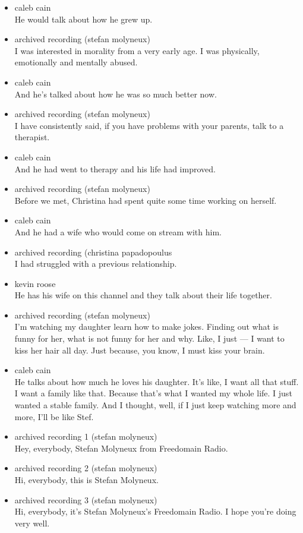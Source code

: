 \begin{itemize}
\item
  caleb cain\\
  He would talk about how he grew up.
\item
  archived recording (stefan molyneux)\\
  I was interested in morality from a very early age. I was physically,
  emotionally and mentally abused.
\item
  caleb cain\\
  And he's talked about how he was so much better now.
\item
  archived recording (stefan molyneux)\\
  I have consistently said, if you have problems with your parents, talk
  to a therapist.
\item
  caleb cain\\
  And he had went to therapy and his life had improved.
\item
  archived recording (stefan molyneux)\\
  Before we met, Christina had spent quite some time working on herself.
\item
  caleb cain\\
  And he had a wife who would come on stream with him.
\item
  archived recording (christina papadopoulus\\
  I had struggled with a previous relationship.
\item
  kevin roose\\
  He has his wife on this channel and they talk about their life
  together.
\item
  archived recording (stefan molyneux)\\
  I'm watching my daughter learn how to make jokes. Finding out what is
  funny for her, what is not funny for her and why. Like, I just --- I
  want to kiss her hair all day. Just because, you know, I must kiss
  your brain.
\item
  caleb cain\\
  He talks about how much he loves his daughter. It's like, I want all
  that stuff. I want a family like that. Because that's what I wanted my
  whole life. I just wanted a stable family. And I thought, well, if I
  just keep watching more and more, I'll be like Stef.
\item
  archived recording 1 (stefan molyneux)\\
  Hey, everybody, Stefan Molyneux from Freedomain Radio.
\item
  archived recording 2 (stefan molyneux)\\
  Hi, everybody, this is Stefan Molyneux.
\item
  archived recording 3 (stefan molyneux)\\
  Hi, everybody, it's Stefan Molyneux's Freedomain Radio. I hope you're
  doing very well.
\end{itemize}

